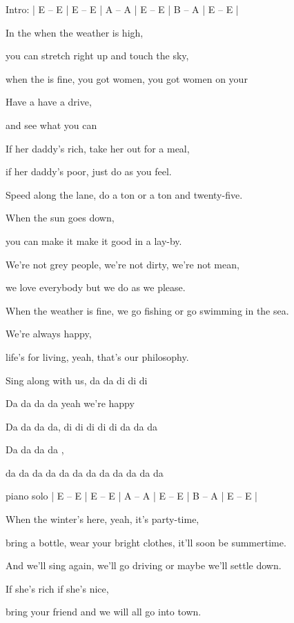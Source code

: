

\ifdefined\TPBAND

	Intro:  
	| E – E | E – E | A – A | E – E | B – A | E – E | 
\fi

\zs
In the  when the weather is high,
                              
you can stretch right up and touch the sky,

when the  is fine, you got women, you got women on your         

Have a  have a drive, 

 and see what you can 
\ks

\zs
If her daddy's rich, take her out for a meal,
                           
if her daddy's poor, just do as you feel.

Speed along the lane, do a ton or a ton and twenty-five.
         
When the sun goes down,   

you can make it make it good in a lay-by.
\ks

\zs
We're not grey people, we're not dirty, we're not mean,
                             
we love everybody but we do as we please.

When the weather is fine, we go fishing or go swimming in the sea.      

We're always happy,

life's for living, yeah, that's our philosophy.
\ks

\zs
Sing along with us, da da di di di 
                       
Da da da da yeah we’re happy 

Da da da da, di di di di di da da da 

Da da da da , 

da da da da da da da da da da da da 
\ks

\ifdefined\TPBAND
	piano solo 
	| E – E | E – E | A – A | E – E | B – A | E – E | 
\fi

\zs
When the winter's here, yeah, it's party-time, 
                                                       
bring a bottle, wear your bright clothes, it'll soon be summertime.

And we'll sing again, we'll go driving or maybe we'll settle down.    
                
If she's rich if she's nice, 

bring your friend and we will all go into town.
\ks

\kp